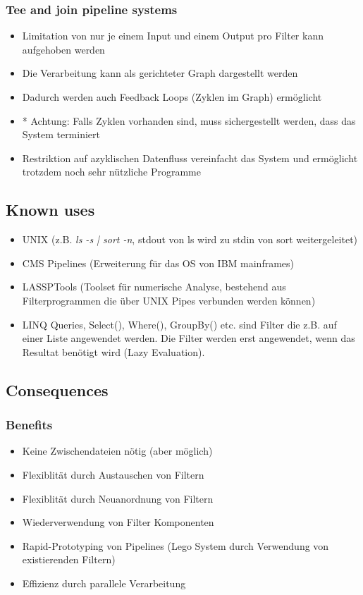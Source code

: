\subsubsection*{Tee and join pipeline systems}

\begin{itemize}
	\item Limitation von nur je einem Input und einem Output pro Filter kann aufgehoben werden
	\item Die Verarbeitung kann als gerichteter Graph dargestellt werden
	\item Dadurch werden auch Feedback Loops (Zyklen im Graph) ermöglicht
	\item * Achtung: Falls Zyklen vorhanden sind, muss sichergestellt werden, dass das System terminiert
	\item Restriktion auf azyklischen Datenfluss vereinfacht das System und ermöglicht trotzdem noch sehr nützliche Programme
\end{itemize}

\subsection*{Known uses}


\begin{itemize}
	\item UNIX (z.B. \textit{ls -s | sort -n}, stdout von ls wird zu stdin von sort weitergeleitet)
	\item CMS Pipelines (Erweiterung für das OS von IBM mainframes)
	\item LASSPTools (Toolset für numerische Analyse, bestehend aus Filterprogrammen die über UNIX Pipes verbunden werden können)
	\item LINQ Queries, Select(), Where(), GroupBy() etc. sind Filter die z.B. auf einer Liste angewendet werden. Die Filter werden erst angewendet, wenn das Resultat benötigt wird (Lazy Evaluation).
\end{itemize}

\subsection*{Consequences}


\subsubsection*{Benefits}


\begin{itemize}
	\item Keine Zwischendateien nötig (aber möglich)
	\item Flexiblität durch Austauschen von Filtern
	\item Flexiblität durch Neuanordnung von Filtern
	\item Wiederverwendung von Filter Komponenten
	\item Rapid-Prototyping von Pipelines (Lego System durch Verwendung von existierenden Filtern)
	\item Effizienz durch parallele Verarbeitung
\end{itemize}

